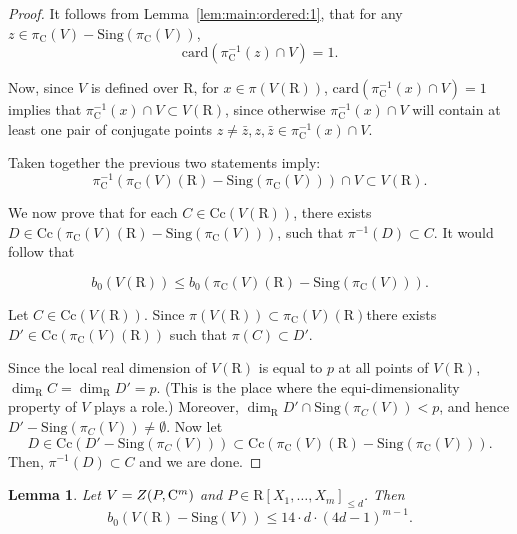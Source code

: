 \documentclass[10pt]{amsart}
\newtheorem{lemma}{Lemma}[section]
\theoremstyle{definition}
\theoremstyle{remark}
\numberwithin{equation}{section}
\newcommand {\R} {\mathrm{R}}
\newcommand {\C}     {\mathrm{C}}
\newcommand {\ZZ} {{\rm Z}}
\newcommand{\card}{\mathrm{card}}
\newcommand{\Cc}{\mathrm{Cc}}
\newcommand{\Sing}{\mathrm{Sing}}
\begin{document}
\begin{proof}
      It follows from Lemma~\ref{lem:main:ordered:1}, that for any
    $z \in \pi_\C(V) - \Sing(\pi_\C(V))$, 
    \[
    \card(\pi_\C^{-1}(z) \cap V) = 1.
    \]
    
    Now, since $V$ is defined over $\R$, for $x \in \pi(V(\R))$,
    $\card(\pi_\C^{-1}(x) \cap V) = 1$ implies that 
    $\pi_\C^{-1}(x) \cap V \subset V(\R)$, since otherwise $\pi_\C^{-1}(x) \cap V$ will contain at least one pair of conjugate points $z \neq \bar{z}, z,\bar{z} \in \pi_\C^{-1}(x) \cap V$.

    Taken together the previous two statements imply: 
    \[
    \pi_\C^{-1}(\pi_\C(V)(\R) - \Sing(\pi_\C(V))) \cap V \subset V(\R). 
    \]

    We now prove that for each $C \in \Cc(V(\R))$, there exists 
    $D \in \Cc(\pi_\C(V)(\R) - \Sing(\pi_\C(V)))$, such that 
    $\pi^{-1}(D) \subset C$. It would follow that

    \[
    b_0(V(\R)) \leq b_0(\pi_\C(V)(\R) - \Sing(\pi_\C(V))).
    \]

    Let $C \in \Cc(V(\R))$. Since $\pi(V(\R)) \subset \pi_\C(V)(\R)$there exists $D' \in \Cc(\pi_\C(V)(\R))$
    such that $\pi(C) \subset D'$. 

Since the local real dimension of $V(\R)$ is equal to $p$ at all points of $V(\R)$,
$\dim_\R C = \dim_\R D' = p$. (This is the place where the equi-dimensionality property of $V$ plays a role.)
Moreover, $\dim_\R D' \cap \Sing(\pi_C(V)) < p$, and hence
    $D' - \Sing(\pi_C(V)) \neq \emptyset$.
    Now let 
    \[
    D \in \Cc(D' - \Sing(\pi_C(V))) \subset \Cc(\pi_\C(V)(\R) - \Sing(\pi_\C(V))).
    \]
Then, $\pi^{-1}(D) \subset C$ and we are done.
\end{proof}

\begin{lemma}
\label{lem:main:ordered:3}
    Let $V = \ZZ(P,\C^{m})$ and $P \in \R[X_1,\ldots,X_m]_{\leq d}$.
    Then
    \[
        b_0(V(\R) - \Sing(V)) \leq 14 \cdot d \cdot (4d-1)^{m-1}.
    \]
\end{lemma}
\end{document}
